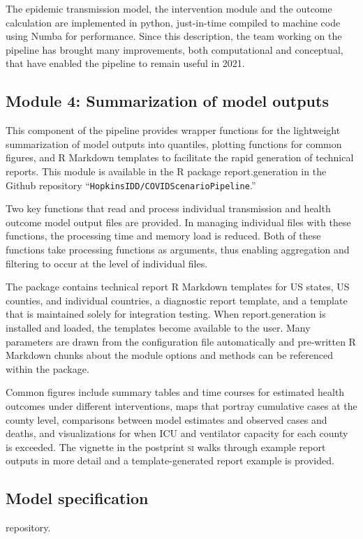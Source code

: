 {The epidemic transmission model, the intervention module and the outcome calculation are implemented in python, just-in-time compiled to machine code using Numba\cite{Lam:NumbaLLVMbasedPython:2015} for performance. Since this description, the team working on the pipeline has brought many improvements, both computational and conceptual, that have enabled the pipeline to remain useful in 2021.

\subsection{Module 4: Summarization of model outputs}
This component of the pipeline provides wrapper functions for the lightweight summarization of model outputs into quantiles, plotting functions for common figures, and R Markdown templates to facilitate the rapid generation of technical reports. This module is available in the R package report.generation in the Github repository “\verb|HopkinsIDD/COVIDScenarioPipeline|.”

Two key functions that read and process individual transmission and health outcome model output files are provided. In managing individual files with these functions, the processing time and memory load is reduced. Both of these functions take processing functions as arguments, thus enabling aggregation and filtering to occur at the level of individual files.

The package contains technical report R Markdown templates for US states, US counties, and individual countries, a diagnostic report template, and a template that is maintained solely for integration testing. When report.generation is installed and loaded, the templates become available to the user. Many parameters are drawn from the configuration file automatically and pre-written R Markdown chunks about the module options and methods can be referenced within the package.

Common figures include summary tables and time courses for estimated health outcomes under different interventions, maps that portray cumulative cases at the county level, comparisons between model estimates and observed cases and deaths, and visualizations for when ICU and ventilator capacity for each county is exceeded. The vignette in the postprint \textsc{si} walks through example report outputs in more detail and a template-generated report example is provided.

\subsection{Model specification}
 repository.}
